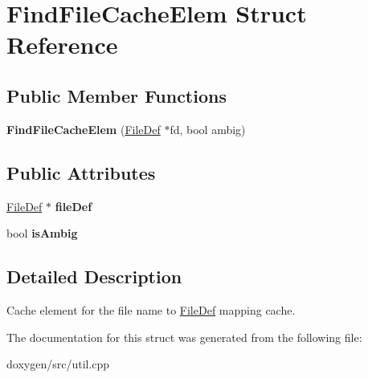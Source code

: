 \hypertarget{struct_find_file_cache_elem}{}\section{Find\+File\+Cache\+Elem Struct Reference}
\label{struct_find_file_cache_elem}
\subsection*{Public Member Functions}
\begin{DoxyCompactItemize}
\item 
\mbox{\label{struct_find_file_cache_elem_abe37384216a36e8e4e225ebb8b487dd7}} 
{\bfseries Find\+File\+Cache\+Elem} (\mbox{\hyperlink{class_file_def}{File\+Def}} $\ast$fd, bool ambig)
\end{DoxyCompactItemize}
\subsection*{Public Attributes}
\begin{DoxyCompactItemize}
\item 
\mbox{\label{struct_find_file_cache_elem_a39ee6985f0ee3593ee2d8d0b9e0f5006}} 
\mbox{\hyperlink{class_file_def}{File\+Def}} $\ast$ {\bfseries file\+Def}
\item 
\mbox{\label{struct_find_file_cache_elem_a380e1879b7462592ef5eb5c7289f5714}} 
bool {\bfseries is\+Ambig}
\end{DoxyCompactItemize}


\subsection{Detailed Description}
Cache element for the file name to \mbox{\hyperlink{class_file_def}{File\+Def}} mapping cache. 

The documentation for this struct was generated from the following file\+:\begin{DoxyCompactItemize}
\item 
doxygen/src/util.\+cpp\end{DoxyCompactItemize}
